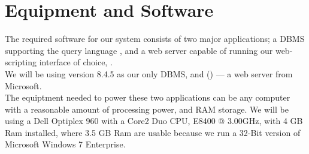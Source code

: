 \section{Equipment and Software}
\label{sec:equipmentsoftware}

The required software for our system consists of two major applications; a DBMS supporting the query language \sql[], and a web server capable of running our web-scripting interface of choice, \aspnet[].\\
We will be using \posgresql[] version 8.4.5 as our only DBMS, and  \wholeiis[] (\iis[]) --- a web server from Microsoft.\\

The equiptment needed to power these two applications can be any computer with a reasonable amount of processing power, and RAM storage. We will be using a Dell Optiplex 960 with a Core2 Duo CPU, E8400 @ 3.00GHz, with 4 GB Ram installed, where 3.5 GB Ram are usable because we run a 32-Bit version of Microsoft Windows 7 Enterprise.